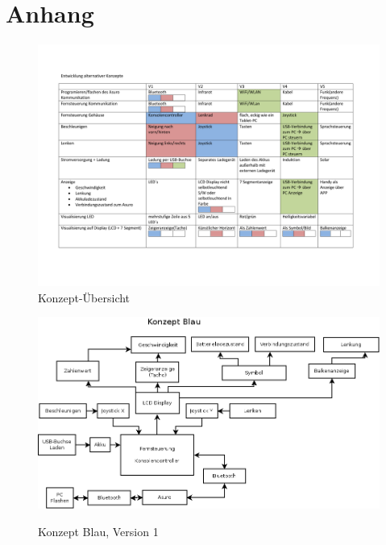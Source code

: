 \chapter{Anhang}

\begin{figure}
	\centering
	\includegraphics[angle=90, width=\textwidth]{konzepte_v1/Konzepte.pdf}
	\caption{Konzept-Übersicht}
	\label{fig:konzepte}
\end{figure}

\begin{figure}
	\centering
	\includegraphics[width=\textwidth]{konzepte_v1/Konzept_Blau.png}
	\label{fig:blau_v1}
	\caption{Konzept Blau, Version 1}
\end{figure}


